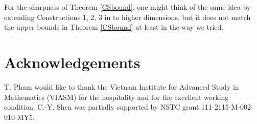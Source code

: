 \documentclass[11pt]{article}
\newcommand{\1}{\mathbf{1}}
\begin{document}
For the sharpness of Theorem \ref{CSbound}, one might think of the same idea by extending Constructions 1, 2, 3 in \cite{FuRen} to higher dimensions, but it does not match the upper bounds in Theorem \ref{CSbound} at least in the way we tried. 


\section{Acknowledgements}
T. Pham would like to thank the Vietnam Institute for Advanced Study in Mathematics (VIASM) for the hospitality and for the excellent working condition. C.-Y. Shen was partially supported by NSTC grant 111-2115-M-002-010-MY5.
\end{document}
